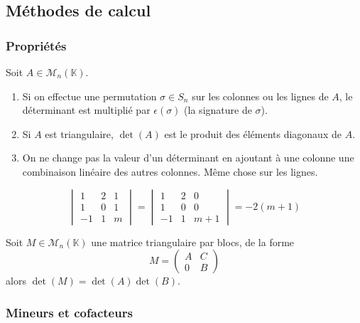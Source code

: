   \subsection{Méthodes de calcul}

  \subsubsection{Propriétés}

  \begin{proposition}
    Soit $A \in \mathcal{M}_n(\mathbb{K})$.
    \begin{enumerate}[label={\bfseries(\roman*)}]
      \item Si on effectue une permutation $\sigma \in S_n$ sur les colonnes ou les lignes de $A$, le déterminant est multiplié par $\epsilon(\sigma)$ (la signature de $\sigma$).
      \item Si $A$ est triangulaire, $\det(A)$ est le produit des éléments diagonaux de $A$.
      \item On ne change pas la valeur d'un déterminant en ajoutant à une colonne une combinaison linéaire des autres colonnes. Même chose sur les lignes.
    \end{enumerate}
  \end{proposition}

  \begin{example}
    \[
    \begin{vmatrix}
      1 & 2 & 1 \\
      1 & 0 & 1 \\
      -1 & 1 & m
    \end{vmatrix}
    = \begin{vmatrix}
      1 & 2 & 0 \\
      1 & 0 & 0 \\
      -1 & 1 & m+1
    \end{vmatrix}
    = -2(m+1)
    \]
  \end{example}

  \begin{proposition}
    Soit $M \in \mathcal{M}_n(\mathbb{K})$ une matrice triangulaire par blocs, de la forme
    \[
    M =
    \begin{pmatrix}
      A & C \\
      0 & B
    \end{pmatrix}
    \]
    alors $\det(M) = \det(A) \det(B)$.
  \end{proposition}

  \subsubsection{Mineurs et cofacteurs}

